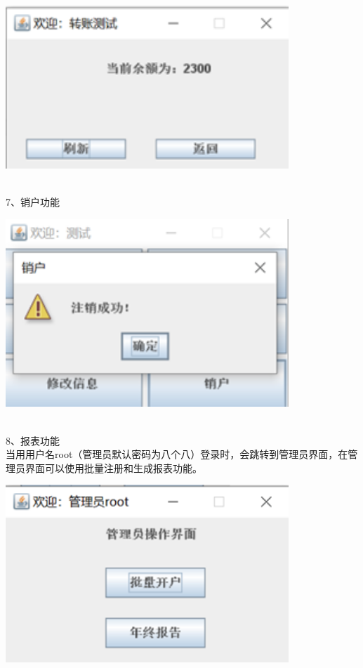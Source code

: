 \begin{centering}
	\centering
	\includegraphics[width=0.8\textwidth]{figure/图13}
	\label{fig:example}
\end{centering}\\
7、销户功能\\
\begin{centering}
	\centering
	\includegraphics[width=0.8\textwidth]{figure/图14}
	\label{fig:example}
\end{centering}\\
8、报表功能\\
当用用户名root（管理员默认密码为八个八）登录时，会跳转到管理员界面，在管理员界面可以使用批量注册和生成报表功能。\\
\begin{centering}
	\centering
	\includegraphics[width=0.8\textwidth]{figure/图15}
	\label{fig:example}
\end{centering}
